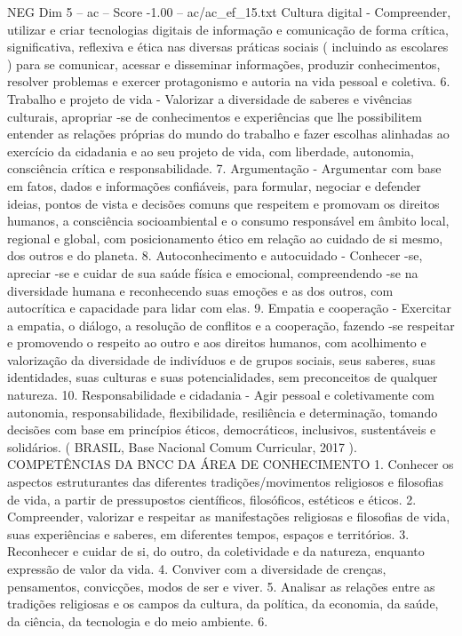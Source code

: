 \begin{textsample}{NEG Dim 5 – ac – Score -1.00 – ac/ac\_ef\_15.txt}
Cultura digital - Compreender, utilizar e criar tecnologias digitais de informação e comunicação de forma crítica, significativa, reflexiva e ética nas diversas práticas sociais ( incluindo as escolares ) para se comunicar, acessar e disseminar informações, produzir conhecimentos, resolver problemas e exercer protagonismo e autoria na vida pessoal e coletiva. 6.
Trabalho e projeto de vida - Valorizar a diversidade de saberes e vivências culturais, apropriar -se de conhecimentos e experiências que lhe possibilitem entender as relações próprias do mundo do trabalho e fazer escolhas alinhadas ao exercício da cidadania e ao seu projeto de vida, com liberdade, autonomia, consciência crítica e responsabilidade. 7.
Argumentação - Argumentar com base em fatos, dados e informações confiáveis, para formular, negociar e defender ideias, pontos de vista e decisões comuns que respeitem e promovam os direitos humanos, a consciência socioambiental e o consumo responsável em âmbito local, regional e global, com posicionamento ético em relação ao cuidado de si mesmo, dos outros e do planeta. 8.
Autoconhecimento e autocuidado - Conhecer -se, apreciar -se e cuidar de sua saúde física e emocional, compreendendo -se na diversidade humana e reconhecendo suas emoções e as dos outros, com autocrítica e capacidade para lidar com elas. 9.
Empatia e cooperação - Exercitar a empatia, o diálogo, a resolução de conflitos e a cooperação, fazendo -se respeitar e promovendo o respeito ao outro e aos direitos humanos, com acolhimento e valorização da diversidade de indivíduos e de grupos sociais, seus saberes, suas identidades, suas culturas e suas potencialidades, sem preconceitos de qualquer natureza. 10.
Responsabilidade e cidadania - Agir pessoal e coletivamente com autonomia, responsabilidade, flexibilidade, resiliência e determinação, tomando decisões com base em princípios éticos, democráticos, inclusivos, sustentáveis e solidários. ( BRASIL, Base Nacional Comum Curricular, 2017 ).
COMPETÊNCIAS DA BNCC DA ÁREA DE CONHECIMENTO 1.
Conhecer os aspectos estruturantes das diferentes tradições/movimentos religiosos e filosofias de vida, a partir de pressupostos científicos, filosóficos, estéticos e éticos. 2.
Compreender, valorizar e respeitar as manifestações religiosas e filosofias de vida, suas experiências e saberes, em diferentes tempos, espaços e territórios. 3.
Reconhecer e cuidar de si, do outro, da coletividade e da natureza, enquanto expressão de valor da vida. 4.
Conviver com a diversidade de crenças, pensamentos, convicções, modos de ser e viver. 5.
Analisar as relações entre as tradições religiosas e os campos da cultura, da política, da economia, da saúde, da ciência, da tecnologia e do meio ambiente. 6.

\end{textsample}
